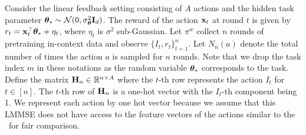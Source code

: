 %
%
Consider the linear feedback setting consisting of $A$ actions and the hidden task parameter $\boldsymbol{\theta}_{*}\sim\mathcal{N}(0,\sigma^2_{\boldsymbol{\theta}}\mathbf{I}_d)$. The reward of the action $\mathbf{x}_{t}$ at round $t$ is given by $r_{t} = \mathbf{x}_{t}^\top\boldsymbol{\theta}_{*} + \eta_{t}$, where $\eta_t$ is $\sigma^2$ sub-Gaussian.
%
Let $\pi^w$ collect $n$ rounds of pretraining in-context data and observe $\{I_t, r_t\}_{t=1}^n$. Let $N_n(a)$ denote the total number of times the action $a$ is sampled for $n$ rounds. Note that we drop the task index $m$ in these notations as the random variable $\boldsymbol{\theta}_{*}$ corresponds to the task.
%
%
Define the matrix $\mathbf{H}_n \in \mathbb{R}^{n \times A}$ where the $t$-th row represents the action $I_t$ for $t\in [n]$. 
%
The $t$-th row of $\mathbf{H}_n$ is a one-hot vector with the  $I_t$-th component being 1. We represent each action by one hot vector because we assume that this LMMSE does not have access to the feature vectors of the actions similar to the \pred~for fair comparison.

